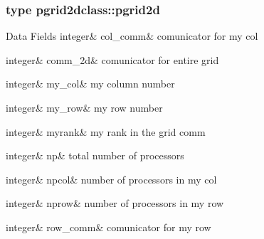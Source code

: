 \subsubsection{type pgrid2dclass\+::pgrid2d}
\begin{DoxyFields}{Data Fields}
\mbox{\label{namespacepgrid2dclass_ab131ddd73cd143b1ba32af178309485d}} 
integer&
col\_comm&
comunicator for my col \\
\hline

\mbox{\label{namespacepgrid2dclass_ae763e51a65cd215ff76ea16e829e8bf0}} 
integer&
comm\_2d&
comunicator for entire grid \\
\hline

\mbox{\label{namespacepgrid2dclass_a912f6614074dde9e6f2c6d6f34d7cb99}} 
integer&
my\_col&
my column number \\
\hline

\mbox{\label{namespacepgrid2dclass_a722de079e498f0585f76a3d2680a6fbe}} 
integer&
my\_row&
my row number \\
\hline

\mbox{\label{namespacepgrid2dclass_ae8fc69fae700a32ac9003f8d4c414ee9}} 
integer&
myrank&
my rank in the grid comm \\
\hline

\mbox{\label{namespacepgrid2dclass_a058fc00a4851927b9f36da91b8188b49}} 
integer&
np&
total number of processors \\
\hline

\mbox{\label{namespacepgrid2dclass_a11d5de618bb0089e48647343ac855183}} 
integer&
npcol&
number of processors in my col \\
\hline

\mbox{\label{namespacepgrid2dclass_a5c94f44dfc943c9d0ffe88a6316999e8}} 
integer&
nprow&
number of processors in my row \\
\hline

\mbox{\label{namespacepgrid2dclass_a69b25ed31a7249c8940100a8977dc1b9}} 
integer&
row\_comm&
comunicator for my row \\
\hline

\end{DoxyFields}
